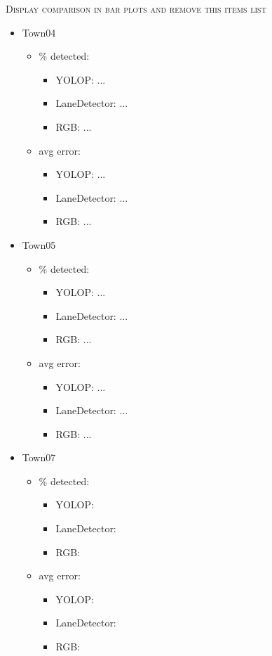 \documentclass[conference]{IEEEtran}
\begin{document}
\textsc{Display comparison in bar plots and remove this items list}
\begin{itemize}
    \item Town04
    \begin{itemize}
        \item \% detected:
        \begin{itemize}
            \item YOLOP: ...
            \item LaneDetector: ...
            \item RGB: ...
        \end{itemize}
        \item avg error:
        \begin{itemize}
            \item YOLOP: ...
            \item LaneDetector: ...
            \item RGB: ...
        \end{itemize}
    \end{itemize}
    \item Town05
    \begin{itemize}
        \item \% detected:
        \begin{itemize}
            \item YOLOP: ...
            \item LaneDetector: ...
            \item RGB: ...
        \end{itemize}
        \item avg error:
        \begin{itemize}
            \item YOLOP: ...
            \item LaneDetector: ...
            \item RGB: ...
        \end{itemize}
    \end{itemize}
    \item Town07
    \begin{itemize}
        \item \% detected:
        \begin{itemize}
            \item YOLOP:
            \item LaneDetector: 
            \item RGB: 
        \end{itemize}
        \item avg error:
        \begin{itemize}
            \item YOLOP:
            \item LaneDetector: 
            \item RGB: 
        \end{itemize}
    \end{itemize}
\end{itemize}
\end{document}
